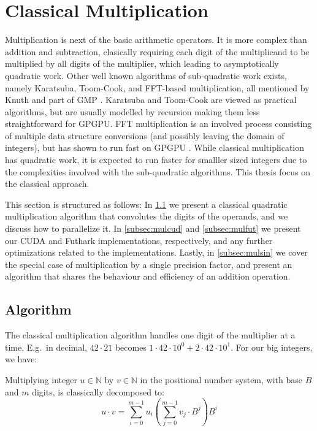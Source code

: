 \section{Classical Multiplication}
\label{sec:mul}

Multiplication is next of the basic arithmetic operators. It is more complex
than addition and subtraction, clasically requiring each digit of the
multiplicand to be multiplied by all digits of the multiplier, which leading to
asymptotically quadratic work. Other well known algorithms of sub-quadratic work
exists, namely Karatsuba, Toom-Cook, and FFT-based multiplication, all mentioned
by Knuth and part of GMP \cite{GMP,knuth97}. Karatsuba and Toom-Cook are viewed
as practical algorithms, but are usually modelled by recursion making them less
straightforward for GPGPU. FFT multiplication is an involved process consisting
of multiple data structure conversions (and possibly leaving the domain of
integers), but has shown to run fast on GPGPU \cite{Bantikyan2014BigIM,
  oancea2024gpu}. While classical multiplication has quadratic work, it is
expected to run faster for smalller sized integers due to the complexities
involved with the sub-quadratic algorithms. This thesis focus on the classical
approach.

This section is structured as follows: In \ref{subsec:mulalg} we present a
classical quadratic multiplication algorithm that convolutes the digits of the
operands, and we discuss how to parallelize it. In \ref{subsec:mulcud} and
\ref{subsec:mulfut} we present our CUDA and Futhark implementations,
respectively, and any further optimizations related to the
implementations. Lastly, in \ref{subsec:mulsin} we cover the special case
of multiplication by a single precision factor, and present an algorithm that
shares the behaviour and efficiency of an addition operation.

\subsection{Algorithm}
\label{subsec:mulalg}

The classical multiplication algorithm handles one digit of the multiplier at a
time. E.g.\ in decimal, $42\cdot 21$ becomes
$1 \cdot 42 \cdot 10^{0} + 2 \cdot 42 \cdot 10^{1}$. For our big integers, we have:

\begin{definition}\label{def:clasmul}
  Multiplying integer $u\in \mathbb{N}$ by $v \in \mathbb{N}$ in the positional number system, with
  base $B$ and $m$ digits, is classically decomposed to:
\begin{equation}
  \label{eq:clasmul0}
  u \cdot v = \sum_{i=0}^{m-1}u_i\left( \sum_{j=0}^{m-1}v_j\cdot B^{j} \right)B^{i}
\end{equation}
\end{definition}

